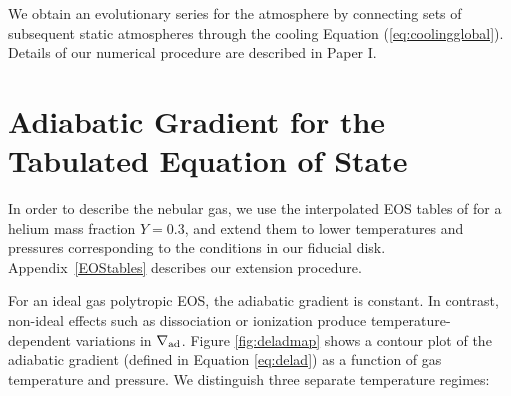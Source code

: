 \documentclass[apj]{emulateapj}
\newcommand{\delad}{\nabla_{\rm ad}}
\newcommand{\App}[1]{Appendix~\ref{#1}}
\newcommand{\co}{_{\rm c}}
\begin{document}

We obtain an evolutionary series for the atmosphere by connecting sets of subsequent static atmospheres through the cooling Equation (\ref{eq:coolingglobal}). Details of our numerical procedure are described in Paper I.



\section{Adiabatic Gradient for the Tabulated Equation of State}
\label{deladtable}





In order to describe the nebular gas, we use the interpolated EOS tables of \citet{saumon95} for a helium mass fraction $Y=0.3$, and extend them to lower temperatures and pressures corresponding to the conditions in our fiducial disk. \App{EOStables} describes our extension procedure.


For an ideal gas polytropic EOS, the adiabatic gradient is constant. In contrast, non-ideal effects such as dissociation or ionization produce temperature-dependent variations in $\delad$. Figure \ref{fig:deladmap} shows a contour plot of the adiabatic gradient (defined in Equation \ref{eq:delad})  as a function of gas temperature and pressure. We distinguish three separate temperature regimes:

\end{document}
